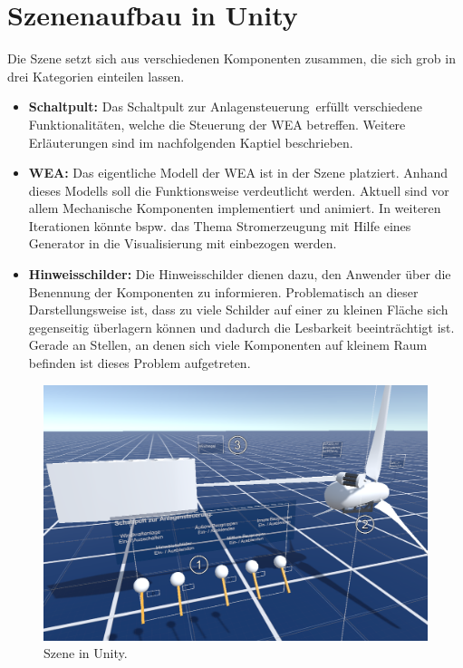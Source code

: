 \section{Szenenaufbau in Unity}
\label{sec:Szenenaufbau}

Die Szene setzt sich aus verschiedenen Komponenten zusammen, die sich grob in drei Kategorien einteilen lassen.

\begin{itemize}
\item \textbf{Schaltpult:} Das \glqq Schaltpult zur Anlagensteuerung\grqq\,   erfüllt verschiedene Funktionalitäten, welche die Steuerung der WEA betreffen. Weitere Erläuterungen sind im nachfolgenden Kaptiel  beschrieben. 

\item \textbf{WEA:}  
Das eigentliche Modell der WEA   ist in der Szene platziert. Anhand dieses Modells soll die Funktionsweise verdeutlicht werden. Aktuell sind vor allem Mechanische Komponenten implementiert und animiert. In weiteren Iterationen könnte bspw. das Thema Stromerzeugung mit Hilfe eines Generator in die Visualisierung mit einbezogen werden. 

\item \textbf{Hinweisschilder:} Die Hinweisschilder  dienen dazu, den Anwender über die Benennung der Komponenten zu informieren. Problematisch an dieser Darstellungsweise ist, dass zu viele Schilder auf einer zu kleinen Fläche sich gegenseitig überlagern können und dadurch die Lesbarkeit beeinträchtigt ist. Gerade an Stellen, an denen sich viele Komponenten auf kleinem Raum befinden ist dieses Problem aufgetreten.

\end{itemize}
  
\begin{figure}[H]
	\centering
	\captionsetup{width=1\textwidth}
	\includegraphics[keepaspectratio, width=1\textwidth]{bildquellen/szene}
	\caption{Szene in Unity.}
	\label{fig:4.1}
\end{figure}

